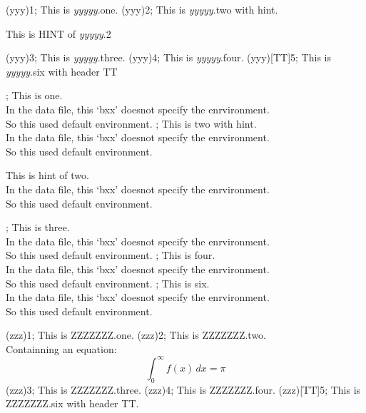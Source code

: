 \bxx(yyy)1;
This is {\it yyyyy}.one.
\exx
\bxx(yyy)2;
This is {\it yyyyy}.two with hint.
\exx
\begin{hint}
This is HINT of {\it yyyyy}.2
\end{hint}
\bxx(yyy)3;
This is {\it yyyyy}.three.
\exx
\bxx(yyy)4;
This is {\it yyyyy}.four.
\exx
\bxx(yyy)[TT]5;
This is {\it yyyyy}.six with header TT
\exx

^^M %

;
This is one.
\\In the data file, this `bxx' doesnot specify the enrvironment.
\\So this used default environment.
\exx
{};
This is two with hint.
\\In the data file, this `bxx' doesnot specify the enrvironment.
\\So this used default environment.
\exx
\begin{hint}
This is hint of two.
\\In the data file, this `bxx' doesnot specify the enrvironment.
\\So this used default environment.
\end{hint}
;
This is three.
\\In the data file, this `bxx' doesnot specify the enrvironment.
\\So this used default environment.
\exx
{};
This is four.
\\In the data file, this `bxx' doesnot specify the enrvironment.
\\So this used default environment.
\exx
{};
This is six.
\\In the data file, this `bxx' doesnot specify the enrvironment.
\\So this used default environment.
\exx

^^M %

\bxx(zzz)1;
This is ZZZZZZZ.one.
\exx
\bxx(zzz)2;
This is ZZZZZZZ.two.
\\Containning an equation:
\begin{equation}
\int_{0}^{\infty}f(x)\,dx = \pi
\end{equation}
\exx
\bxx(zzz)3;
This is ZZZZZZZ.three.
\exx
\bxx(zzz)4;
This is ZZZZZZZ.four.
\exx
\bxx(zzz)[TT]5;
This is ZZZZZZZ.six with header TT.
\exx
\endinput
